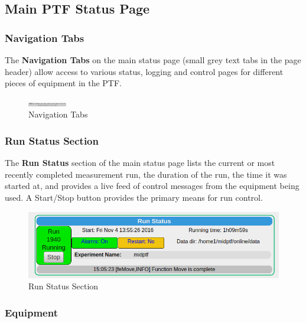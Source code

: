 \documentclass[twoside,letterpaper]{refart}
\begin{document}
\clearpage

\subsection{Main PTF Status Page}

\subsubsection{Navigation Tabs} The \textbf{Navigation Tabs} on the main status page (small grey text tabs in the page header) allow access to various status, logging and control pages for different pieces of equipment in the PTF.

\FloatBarrier

\begin{figure}[!htpb]\centering	
	\includegraphics[width=0.15\textwidth]{images/navTabs.png}
	\caption{Navigation Tabs\label{navTabs}}
\end{figure}

\FloatBarrier

\subsubsection{Run Status Section}

The \textbf{Run Status} section of the main status page lists the current or most recently completed measurement run, the duration of the run, the time it was started at, and provides a live feed of control messages from the equipment being used. A Start/Stop button provides the primary means for run control.

\FloatBarrier

\begin{figure}[!htpb]\centering	
	\includegraphics[width=\textwidth]{images/runStatus.png}
	\caption{Run Status Section\label{runStatus}}
\end{figure}

\FloatBarrier

\subsubsection{Equipment}
\end{document}
